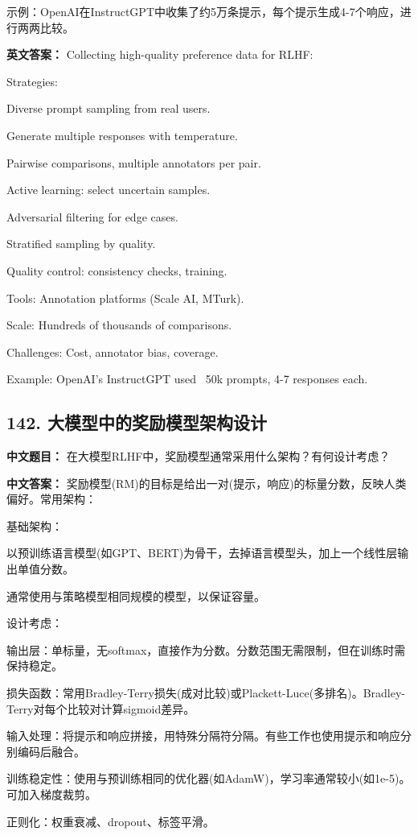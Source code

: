 \documentclass[10pt,a4paper]{ctexart}
\begin{document}
示例：OpenAI在InstructGPT中收集了约5万条提示，每个提示生成4-7个响应，进行两两比较。

\textbf{英文答案：}
Collecting high-quality preference data for RLHF:

Strategies:

Diverse prompt sampling from real users.

Generate multiple responses with temperature.

Pairwise comparisons, multiple annotators per pair.

Active learning: select uncertain samples.

Adversarial filtering for edge cases.

Stratified sampling by quality.

Quality control: consistency checks, training.

Tools: Annotation platforms (Scale AI, MTurk).

Scale: Hundreds of thousands of comparisons.

Challenges: Cost, annotator bias, coverage.

Example: OpenAI's InstructGPT used ~50k prompts, 4-7 responses each.

\subsection*{142. 大模型中的奖励模型架构设计}
\textbf{中文题目：} 在大模型RLHF中，奖励模型通常采用什么架构？有何设计考虑？

\textbf{中文答案：}
奖励模型(RM)的目标是给出一对(提示，响应)的标量分数，反映人类偏好。常用架构：

基础架构：

以预训练语言模型(如GPT、BERT)为骨干，去掉语言模型头，加上一个线性层输出单值分数。

通常使用与策略模型相同规模的模型，以保证容量。

设计考虑：

输出层：单标量，无softmax，直接作为分数。分数范围无需限制，但在训练时需保持稳定。

损失函数：常用Bradley-Terry损失(成对比较)或Plackett-Luce(多排名)。Bradley-Terry对每个比较对计算sigmoid差异。

输入处理：将提示和响应拼接，用特殊分隔符分隔。有些工作也使用提示和响应分别编码后融合。

训练稳定性：使用与预训练相同的优化器(如AdamW)，学习率通常较小(如1e-5)。可加入梯度裁剪。

正则化：权重衰减、dropout、标签平滑。
\end{document}
